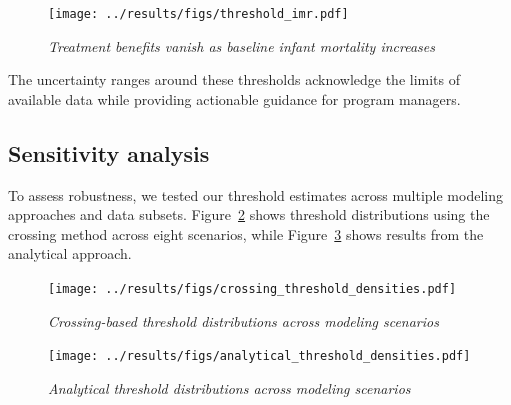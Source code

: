 \documentclass[11pt]{article}\usepackage[]{graphicx}\usepackage[]{xcolor}
\begin{document}
\begin{figure}[!h]
\centering
\texttt{[image: ../results/figs/threshold\_imr.pdf]}
\caption{\emph{Treatment benefits vanish as baseline infant mortality increases}}
\label{fig:mortality-predictions2}
\end{figure}

The uncertainty ranges around these thresholds acknowledge the limits of available data while providing actionable guidance for program managers.

\subsection{Sensitivity analysis}

To assess robustness, we tested our threshold estimates across multiple modeling approaches and data subsets. Figure~\ref{fig:crossing-sensitivity} shows threshold distributions using the crossing method across eight scenarios, while Figure~\ref{fig:analytical-sensitivity} shows results from the analytical approach.

\begin{figure}[!h]
\centering
\texttt{[image: ../results/figs/crossing\_threshold\_densities.pdf]}
\caption{\emph{Crossing-based threshold distributions across modeling scenarios}}
\label{fig:crossing-sensitivity}
\end{figure}

\begin{figure}[!h]
\centering
\texttt{[image: ../results/figs/analytical\_threshold\_densities.pdf]}
\caption{\emph{Analytical threshold distributions across modeling scenarios}}
\label{fig:analytical-sensitivity}
\end{figure}
\end{document}
